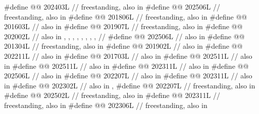 \begin{codeblock}
#define @@                         202403L // freestanding, also in 
#define @@                     202506L // freestanding, also in 
#define @@                 201806L // freestanding, also in 
#define @@           201603L // also in 
#define @@                            201907L // freestanding, also in 
#define @@                          202002L
  // also in , , , , , , , ,
  // 
#define @@                202506L // also in 
#define @@                 201304L // freestanding, also in 
#define @@                         201902L // also in 
#define @@                          202211L // also in 
#define @@                        201703L // also in 
#define @@                          202511L // also in 
#define @@                          202511L // also in 
#define @@                            202311L // also in 
#define @@                       202506L // also in 
#define @@                     202207L // also in 
#define @@                      202311L // also in 
#define @@                        202302L // also in , 
#define @@                      202207L // freestanding, also in 
#define @@            202502L // freestanding, also in 
#define @@                202311L // freestanding, also in 
#define @@          202306L // freestanding, also in 

\end{codeblock}

